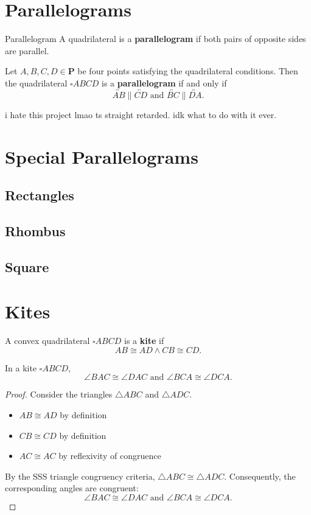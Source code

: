 \documentclass[../../../main/main.tex]{subfiles}
\begin{document}
\section{Parallelograms}
Parallelogram
A quadrilateral is a \textbf{parallelogram} if both pairs of opposite sides are parallel.
\begin{definition}[Parallelogram]
    Let $A,B,C,D \in \mathbf{P}$ be four points satisfying the quadrilateral conditions. Then the quadrilateral $\square ABCD$ is a \textbf{parallelogram} if and only if
    \[
    \overleftrightarrow{AB} \parallel \overleftrightarrow{CD} \text{ and } \overleftrightarrow{BC} \parallel \overleftrightarrow{DA}.
    \]
\end{definition}

i hate this project lmao ts straight retarded. idk what to do with it ever.

\section{Special Parallelograms}

\subsection{Rectangles}

\subsection{Rhombus}

\subsection{Square}

\section{Kites}

\begin{definition}[Kite]
    A convex quadrilateral $\square ABCD$ is a \textbf{kite} if
    \[
    AB \cong AD \land CB \cong CD.
    \]
\end{definition}

\begin{theorem}
    In a kite $\square ABCD$,
    \[
    \angle BAC \cong \angle DAC \text{ and } \angle BCA \cong \angle DCA.
    \]
\end{theorem}
\begin{proof}
    Consider the triangles $\triangle ABC$ and $\triangle ADC$.
    \begin{itemize}
        \item $AB \cong AD$ by definition
        \item $CB \cong CD$ by definition
        \item $AC \cong AC$ by reflexivity of congruence
    \end{itemize}
    By the SSS triangle congruency criteria, $\triangle ABC \cong \triangle ADC$. Consequently, the corresponding angles are congruent:
    \[
    \angle BAC \cong \angle DAC \text{ and } \angle BCA \cong \angle DCA.
    \]
\end{proof}
\end{document}
